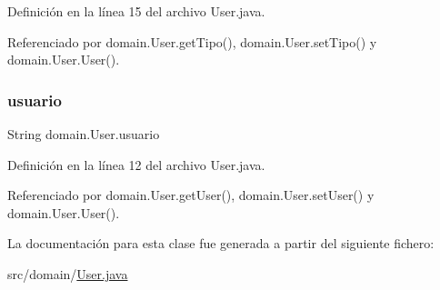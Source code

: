 Definición en la línea 15 del archivo User.\+java.



Referenciado por domain.\+User.\+get\+Tipo(), domain.\+User.\+set\+Tipo() y domain.\+User.\+User().

\mbox{\label{classdomain_1_1User_a3039c018dafefc6ce963346e58f80fe6}} 
\subsubsection{\texorpdfstring{usuario}{usuario}}
{\footnotesize\ttfamily String domain.\+User.\+usuario\hspace{0.3cm}{\ttfamily [private]}}



Definición en la línea 12 del archivo User.\+java.



Referenciado por domain.\+User.\+get\+User(), domain.\+User.\+set\+User() y domain.\+User.\+User().



La documentación para esta clase fue generada a partir del siguiente fichero\+:\begin{DoxyCompactItemize}
\item 
src/domain/\mbox{\hyperlink{User_8java}{User.\+java}}\end{DoxyCompactItemize}
